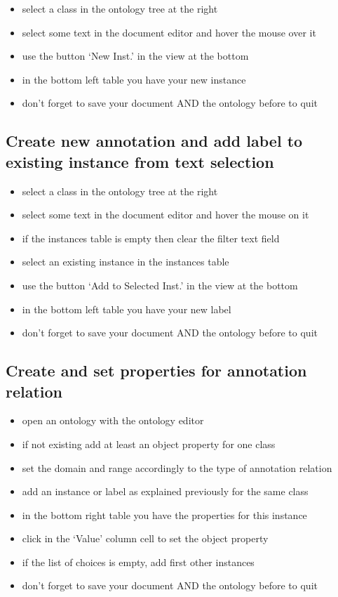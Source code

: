 {\begin{itemize}
\item select a class in the ontology tree at the right
\item select some text in the document editor and hover the mouse over it
\item use the button `New Inst.' in the view at the bottom
\item in the bottom left table you have your new instance
\item don't forget to save your document AND the ontology before to quit
\end{itemize}

\subsection{Create new annotation and add label to existing instance from text selection}

\begin{itemize}
\item select a class in the ontology tree at the right
\item select some text in the document editor and hover the mouse on it
\item if the instances table is empty then clear the filter text field
\item select an existing instance in the instances table
\item use the button `Add to Selected Inst.' in the view at the bottom
\item in the bottom left table you have your new label
\item don't forget to save your document AND the ontology before to quit
\end{itemize}

\subsection{Create and set properties for annotation relation}

\begin{itemize}
\item open an ontology with the ontology editor
\item if not existing add at least an object property for one class
\item set the domain and range accordingly to the type of annotation relation
\item add an instance or label as explained previously for the same class
\item in the bottom right table you have the properties for this instance
\item click in the `Value' column cell to set the object property
\item if the list of choices is empty, add first other instances
\item don't forget to save your document AND the ontology before to quit
\end{itemize}

}
